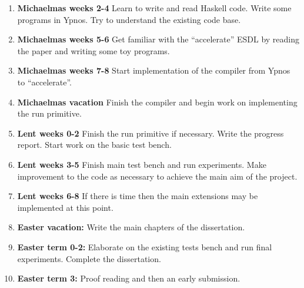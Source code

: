 \begin{enumerate}

\item {\bf Michaelmas weeks 2-4} Learn to write and read Haskell code. Write 
some programs in Ypnos. Try to understand the existing code base. 

\item {\bf Michaelmas weeks 5-6} Get familiar with the ``accelerate'' ESDL by 
reading the paper and writing some toy programs.

\item {\bf Michaelmas weeks 7-8} Start implementation of the compiler from 
Ypnos to ``accelerate''.

\item {\bf Michaelmas vacation} Finish the compiler and begin work on 
implementing the run primitive.

\item {\bf Lent weeks 0-2} Finish the run primitive if necessary. Write the 
progress report. Start work on the basic test bench.

\item {\bf Lent weeks 3-5} Finish main test bench and run experiments. Make 
improvement to the code as necessary to achieve the main aim of the project. 

\item {\bf Lent weeks 6-8} If there is time then the main extensions may be 
implemented at this point.

\item {\bf Easter vacation:} Write the main chapters of the dissertation.

\item {\bf Easter term 0-2:} Elaborate on the existing tests bench and run 
final experiments. Complete the dissertation.

\item {\bf Easter term 3:} Proof reading and then an early submission.  

\end{enumerate}


 

